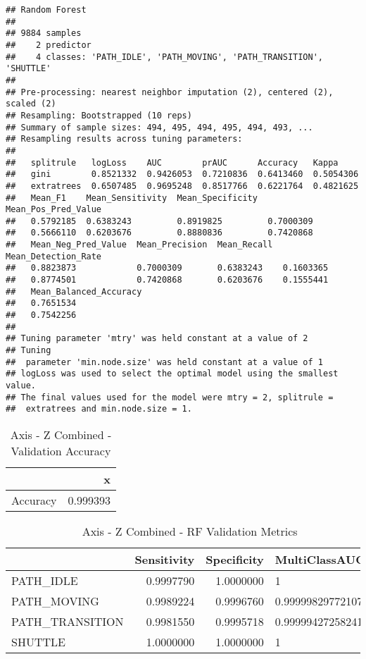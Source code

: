 \documentclass[]{article}
\begin{document}
\begin{verbatim}
## Random Forest 
## 
## 9884 samples
##    2 predictor
##    4 classes: 'PATH_IDLE', 'PATH_MOVING', 'PATH_TRANSITION', 'SHUTTLE' 
## 
## Pre-processing: nearest neighbor imputation (2), centered (2), scaled (2) 
## Resampling: Bootstrapped (10 reps) 
## Summary of sample sizes: 494, 495, 494, 495, 494, 493, ... 
## Resampling results across tuning parameters:
## 
##   splitrule   logLoss    AUC        prAUC      Accuracy   Kappa    
##   gini        0.8521332  0.9426053  0.7210836  0.6413460  0.5054306
##   extratrees  0.6507485  0.9695248  0.8517766  0.6221764  0.4821625
##   Mean_F1    Mean_Sensitivity  Mean_Specificity  Mean_Pos_Pred_Value
##   0.5792185  0.6383243         0.8919825         0.7000309          
##   0.5666110  0.6203676         0.8880836         0.7420868          
##   Mean_Neg_Pred_Value  Mean_Precision  Mean_Recall  Mean_Detection_Rate
##   0.8823873            0.7000309       0.6383243    0.1603365          
##   0.8774501            0.7420868       0.6203676    0.1555441          
##   Mean_Balanced_Accuracy
##   0.7651534             
##   0.7542256             
## 
## Tuning parameter 'mtry' was held constant at a value of 2
## Tuning
##  parameter 'min.node.size' was held constant at a value of 1
## logLoss was used to select the optimal model using the smallest value.
## The final values used for the model were mtry = 2, splitrule =
##  extratrees and min.node.size = 1.
\end{verbatim}

\begin{table}[!h]

\caption{\label{tab:sensor-z-combined-rf-results}Axis - Z Combined - Validation Accuracy}
\centering
\begin{tabular}[t]{lr}
\toprule
  & x\\
\midrule
Accuracy & 0.999393\\
\bottomrule
\end{tabular}
\end{table}

\begin{table}[!h]

\caption{\label{tab:sensor-z-combined-rf-results}Axis - Z Combined - RF Validation Metrics}
\centering
\begin{tabular}[t]{lrrl}
\toprule
  & Sensitivity & Specificity & MultiClassAUC\\
\midrule
PATH\_IDLE & 0.9997790 & 1.0000000 & 1\\
PATH\_MOVING & 0.9989224 & 0.9996760 & 0.999998297721076\\
PATH\_TRANSITION & 0.9981550 & 0.9995718 & 0.999994272582418\\
SHUTTLE & 1.0000000 & 1.0000000 & 1\\
\bottomrule
\end{tabular}
\end{table}
\end{document}
